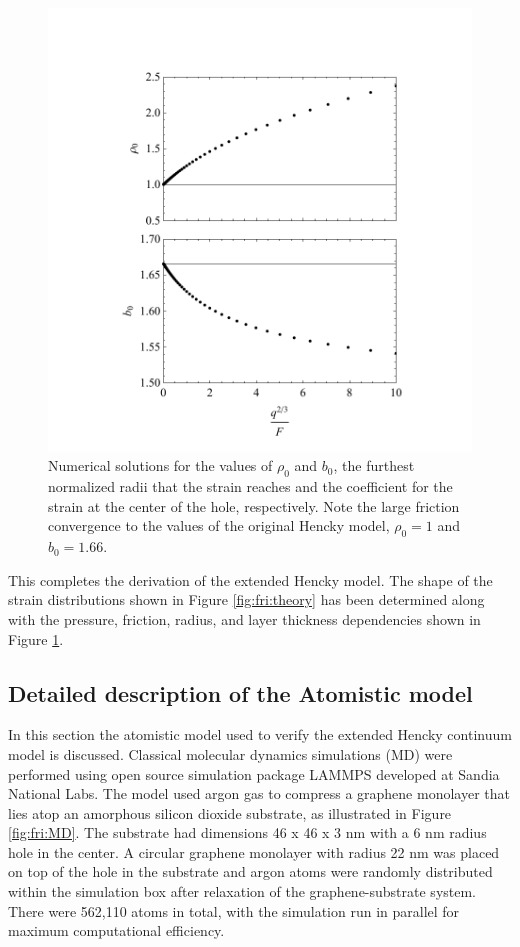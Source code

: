 \begin{figure}
	\begin{center}
	\includegraphics{Figs_Friction/b0rho0.pdf}
	\end{center}
	\caption[Numerical solutions to the continuum model]{\label{fig:fri:rho0b0}
	Numerical solutions for the values of $\rho_0$ and $b_0$, the furthest normalized radii that the strain reaches and the coefficient for the strain at the center of the hole, respectively.
	Note the large friction convergence to the values of the original Hencky model, $\rho_0 = 1$ and $b_0=1.66$.}
\end{figure}

This completes the derivation of the extended Hencky model.
The shape of the strain distributions shown in Figure \ref{fig:fri:theory} has been determined along with the pressure, friction, radius, and layer thickness dependencies shown in Figure \ref{fig:fri:rho0b0}.

\subsection{Detailed description of the Atomistic model \label{sec:fri:atom}}
In this section the atomistic model used to verify the extended Hencky continuum model is discussed.
Classical molecular dynamics simulations (MD) were performed using open source simulation package LAMMPS \cite{plimptonLAMMPS,PlimptonJCP1995} developed at Sandia National Labs.
The model used argon gas to compress a graphene monolayer that lies atop an amorphous silicon dioxide substrate, as illustrated in Figure \ref{fig:fri:MD}.
The substrate had dimensions 46 x 46 x 3 nm with a 6 nm radius hole in the center.
A circular graphene monolayer with radius 22 nm was placed on top of the hole in the substrate and argon atoms were randomly distributed within the simulation box after relaxation of the graphene-substrate system.
There were 562,110 atoms in total, with the simulation run in parallel for maximum computational efficiency.

